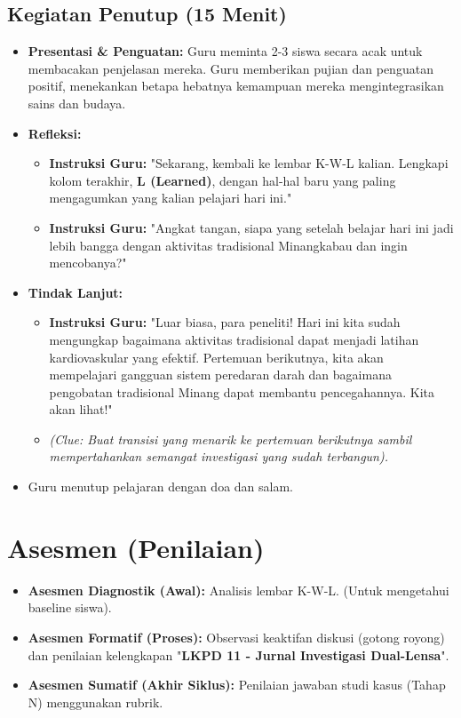 \documentclass[a4paper,12pt]{article}
\begin{document}
\subsection{Kegiatan Penutup (15 Menit)}
\begin{itemize}
\item \textbf{Presentasi \& Penguatan:} Guru meminta 2-3 siswa secara acak untuk membacakan penjelasan mereka. Guru memberikan pujian dan penguatan positif, menekankan betapa hebatnya kemampuan mereka mengintegrasikan sains dan budaya.
\item \textbf{Refleksi:}
    \begin{itemize}
    \item \textbf{Instruksi Guru:} "Sekarang, kembali ke lembar K-W-L kalian. Lengkapi kolom terakhir, \textbf{L (Learned)}, dengan hal-hal baru yang paling mengagumkan yang kalian pelajari hari ini."
    \item \textbf{Instruksi Guru:} "Angkat tangan, siapa yang setelah belajar hari ini jadi lebih bangga dengan aktivitas tradisional Minangkabau dan ingin mencobanya?"
    \end{itemize}
\item \textbf{Tindak Lanjut:}
    \begin{itemize}
    \item \textbf{Instruksi Guru:} "Luar biasa, para peneliti! Hari ini kita sudah mengungkap bagaimana aktivitas tradisional dapat menjadi latihan kardiovaskular yang efektif. Pertemuan berikutnya, kita akan mempelajari gangguan sistem peredaran darah dan bagaimana pengobatan tradisional Minang dapat membantu pencegahannya. Kita akan lihat!"
    \item \textit{(Clue: Buat transisi yang menarik ke pertemuan berikutnya sambil mempertahankan semangat investigasi yang sudah terbangun).}
    \end{itemize}
\item Guru menutup pelajaran dengan doa dan salam.
\end{itemize}

\section{Asesmen (Penilaian)}

\begin{itemize}
\item \textbf{Asesmen Diagnostik (Awal):} Analisis lembar K-W-L. (Untuk mengetahui baseline siswa).
\item \textbf{Asesmen Formatif (Proses):} Observasi keaktifan diskusi (gotong royong) dan penilaian kelengkapan "\textbf{LKPD 11 - Jurnal Investigasi Dual-Lensa}".
\item \textbf{Asesmen Sumatif (Akhir Siklus):} Penilaian jawaban studi kasus (Tahap N) menggunakan rubrik.
\end{itemize}
\end{document}
